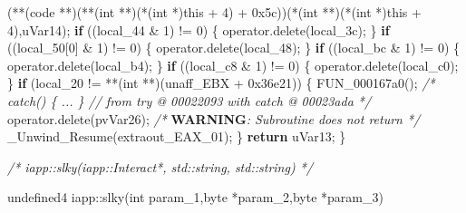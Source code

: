 \documentclass[
]{article}
\newenvironment{Shaded}{}{}
\newcommand{\AlertTok}[1]{\textcolor[rgb]{1.00,0.00,0.00}{\textbf{#1}}}
\newcommand{\BaseNTok}[1]{\textcolor[rgb]{0.25,0.63,0.44}{#1}}
\newcommand{\CommentTok}[1]{\textcolor[rgb]{0.38,0.63,0.69}{\textit{#1}}}
\newcommand{\ControlFlowTok}[1]{\textcolor[rgb]{0.00,0.44,0.13}{\textbf{#1}}}
\newcommand{\DataTypeTok}[1]{\textcolor[rgb]{0.56,0.13,0.00}{#1}}
\newcommand{\DecValTok}[1]{\textcolor[rgb]{0.25,0.63,0.44}{#1}}
\newcommand{\NormalTok}[1]{#1}
\newcommand{\OperatorTok}[1]{\textcolor[rgb]{0.40,0.40,0.40}{#1}}
\begin{document}
\begin{Shaded}
\begin{Highlighting}[]
  \OperatorTok{(**(}\NormalTok{code }\OperatorTok{**)(**(}\DataTypeTok{int} \OperatorTok{**)(*(}\DataTypeTok{int} \OperatorTok{*)}\NormalTok{this }\OperatorTok{+} \DecValTok{4}\OperatorTok{)} \OperatorTok{+} \BaseNTok{0x5c}\OperatorTok{))(*(}\DataTypeTok{int} \OperatorTok{**)(*(}\DataTypeTok{int} \OperatorTok{*)}\NormalTok{this }\OperatorTok{+} \DecValTok{4}\OperatorTok{),}\NormalTok{uVar14}\OperatorTok{);}
  \ControlFlowTok{if} \OperatorTok{((}\NormalTok{local\_44 }\OperatorTok{\&} \DecValTok{1}\OperatorTok{)} \OperatorTok{!=} \DecValTok{0}\OperatorTok{)} \OperatorTok{\{}
\NormalTok{    operator}\OperatorTok{.}\NormalTok{delete}\OperatorTok{(}\NormalTok{local\_3c}\OperatorTok{);}
  \OperatorTok{\}}
  \ControlFlowTok{if} \OperatorTok{((}\NormalTok{local\_50}\OperatorTok{[}\DecValTok{0}\OperatorTok{]} \OperatorTok{\&} \DecValTok{1}\OperatorTok{)} \OperatorTok{!=} \DecValTok{0}\OperatorTok{)} \OperatorTok{\{}
\NormalTok{    operator}\OperatorTok{.}\NormalTok{delete}\OperatorTok{(}\NormalTok{local\_48}\OperatorTok{);}
  \OperatorTok{\}}
  \ControlFlowTok{if} \OperatorTok{((}\NormalTok{local\_bc }\OperatorTok{\&} \DecValTok{1}\OperatorTok{)} \OperatorTok{!=} \DecValTok{0}\OperatorTok{)} \OperatorTok{\{}
\NormalTok{    operator}\OperatorTok{.}\NormalTok{delete}\OperatorTok{(}\NormalTok{local\_b4}\OperatorTok{);}
  \OperatorTok{\}}
  \ControlFlowTok{if} \OperatorTok{((}\NormalTok{local\_c8 }\OperatorTok{\&} \DecValTok{1}\OperatorTok{)} \OperatorTok{!=} \DecValTok{0}\OperatorTok{)} \OperatorTok{\{}
\NormalTok{    operator}\OperatorTok{.}\NormalTok{delete}\OperatorTok{(}\NormalTok{local\_c0}\OperatorTok{);}
  \OperatorTok{\}}
  \ControlFlowTok{if} \OperatorTok{(}\NormalTok{local\_20 }\OperatorTok{!=} \OperatorTok{**(}\DataTypeTok{int} \OperatorTok{**)(}\NormalTok{unaff\_EBX }\OperatorTok{+} \BaseNTok{0x36e21}\OperatorTok{))} \OperatorTok{\{}
\NormalTok{    FUN\_000167a0}\OperatorTok{();}
                    \CommentTok{/* catch() \{ ... \} // from try @ 00022093 with catch @ 00023ada */}
\NormalTok{    operator}\OperatorTok{.}\NormalTok{delete}\OperatorTok{(}\NormalTok{pvVar26}\OperatorTok{);}
                    \CommentTok{/* }\AlertTok{WARNING}\CommentTok{: Subroutine does not return */}
\NormalTok{    \_Unwind\_Resume}\OperatorTok{(}\NormalTok{extraout\_EAX\_01}\OperatorTok{);}
  \OperatorTok{\}}
  \ControlFlowTok{return}\NormalTok{ uVar13}\OperatorTok{;}
\OperatorTok{\}}


\CommentTok{/* iapp::slky(iapp::Interact*, std::string, std::string) */}

\NormalTok{undefined4 iapp}\OperatorTok{::}\NormalTok{slky}\OperatorTok{(}\DataTypeTok{int}\NormalTok{ param\_1}\OperatorTok{,}\NormalTok{byte }\OperatorTok{*}\NormalTok{param\_2}\OperatorTok{,}\NormalTok{byte }\OperatorTok{*}\NormalTok{param\_3}\OperatorTok{)}


\end{Highlighting}
\end{Shaded}
\end{document}
